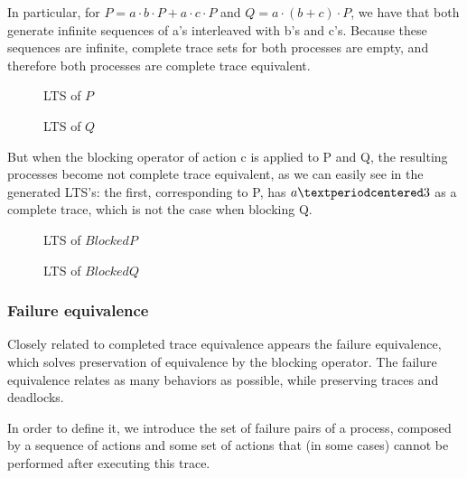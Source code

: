 \documentclass[11pt]{article}
\theoremstyle{definition}
\newcommand{\cmark}{\ding{51}}
\theoremstyle{plain}
\theoremstyle{definition}
\begin{document}
In particular, for $ P = a·b·P + a·c·P $ and $ Q = a·(b+c)·P $, we have that both generate infinite sequences of a's interleaved with b's and c's. Because these sequences are infinite, complete trace sets for both processes are empty, and therefore both processes are complete trace equivalent.

\begin{figure} [H]
	\centering
	
	\caption{LTS of $P$} \label{fig:CompleteTraceEquivalenceP}
	\endminipage\hfill
	\centering
	
	\caption{LTS of $Q$} \label{fig:CompleteTraceEquivalenceQ}
	\endminipage\hfill
\end{figure}

But when the blocking operator of action c is applied to P and Q, the resulting processes become not complete trace equivalent, as we can easily see in the generated LTS's: the first, corresponding to P, has $ a·\cmark $ as a complete trace, which is not the case when blocking Q.

\begin{figure} [H]
	\centering
	
	\caption{LTS of $Blocked P$} \label{fig:CompleteTraceEquivalenceBlockedP}
	\endminipage\hfill
	\centering
	
	\caption{LTS of $Blocked Q$} \label{fig:CompleteTraceEquivalenceBlockedQ}
	\endminipage\hfill
\end{figure}

\subsubsection{Failure equivalence}
Closely related to completed trace equivalence appears the failure equivalence, which solves preservation of equivalence by the blocking operator. The failure equivalence relates as many behaviors as possible, while preserving traces and deadlocks.

In order to define it, we introduce the set of failure pairs of a process, composed by a sequence of actions and some set of actions that (in some cases) cannot be performed after executing this trace.
\end{document}
